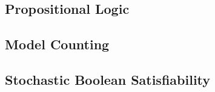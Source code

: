 \subsection{Propositional Logic}
\subsection{Model Counting}
\subsection{Stochastic Boolean Satisfiability}
